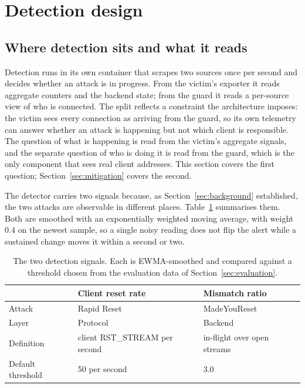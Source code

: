 \documentclass[a4paper,fleqn]{cas-dc}
\begin{document}
\section{Detection design}\label{sec:detection}

\subsection{Where detection sits and what it reads}\label{sec:detector-position}

Detection runs in its own container that scrapes two sources once per second and decides whether an attack is in progress. From the victim's exporter it reads aggregate counters and the backend state; from the guard it reads a per-source view of who is connected. The split reflects a constraint the architecture imposes: the victim sees every connection as arriving from the guard, so its own telemetry can answer whether an attack is happening but not which client is responsible. The question of what is happening is read from the victim's aggregate signals, and the separate question of who is doing it is read from the guard, which is the only component that sees real client addresses. This section covers the first question; Section~\ref{sec:mitigation} covers the second.

The detector carries two signals because, as Section~\ref{sec:background} established, the two attacks are observable in different places. Table~\ref{tab:signals} summarises them. Both are smoothed with an exponentially weighted moving average, with weight 0.4 on the newest sample, so a single noisy reading does not flip the alert while a sustained change moves it within a second or two.

\begin{table}[tp]
\centering
\caption{The two detection signals. Each is EWMA-smoothed and compared against a threshold chosen from the evaluation data of Section~\ref{sec:evaluation}.}
\label{tab:signals}
\begin{tabular}{@{}lll@{}}
\toprule
 & Client reset rate & Mismatch ratio \\
\midrule
Attack & Rapid Reset & MadeYouReset \\
Layer & Protocol & Backend \\
Definition & client RST\_STREAM per second & in-flight over open streams \\
Default threshold & 50 per second & 3.0 \\
\bottomrule
\end{tabular}
\end{table}
\end{document}
